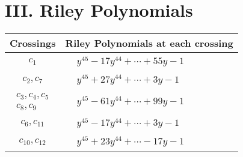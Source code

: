 \documentclass[1p]{elsarticle_modified}
\theoremstyle{definition}
\begin{document}
\centering \section*{ III. Riley Polynomials}
\begin{tabular}{m{50pt}|m{274pt}}
Crossings & \hspace{64pt}Riley Polynomials at each crossing \\
\hline $$\begin{aligned}c_{1}\end{aligned}$$&$\begin{aligned}
&y^{45}-17 y^{44}+\cdots+55 y-1
\end{aligned}$\\
\hline $$\begin{aligned}c_{2},c_{7}\end{aligned}$$&$\begin{aligned}
&y^{45}+27 y^{44}+\cdots+3 y-1
\end{aligned}$\\
\hline $$\begin{aligned}c_{3},c_{4},c_{5}\\c_{8},c_{9}\end{aligned}$$&$\begin{aligned}
&y^{45}-61 y^{44}+\cdots+99 y-1
\end{aligned}$\\
\hline $$\begin{aligned}c_{6},c_{11}\end{aligned}$$&$\begin{aligned}
&y^{45}-17 y^{44}+\cdots+3 y-1
\end{aligned}$\\
\hline $$\begin{aligned}c_{10},c_{12}\end{aligned}$$&$\begin{aligned}
&y^{45}+23 y^{44}+\cdots-17 y-1
\end{aligned}$\\
\hline
\end{tabular}
\vskip 2pc
\end{document}
